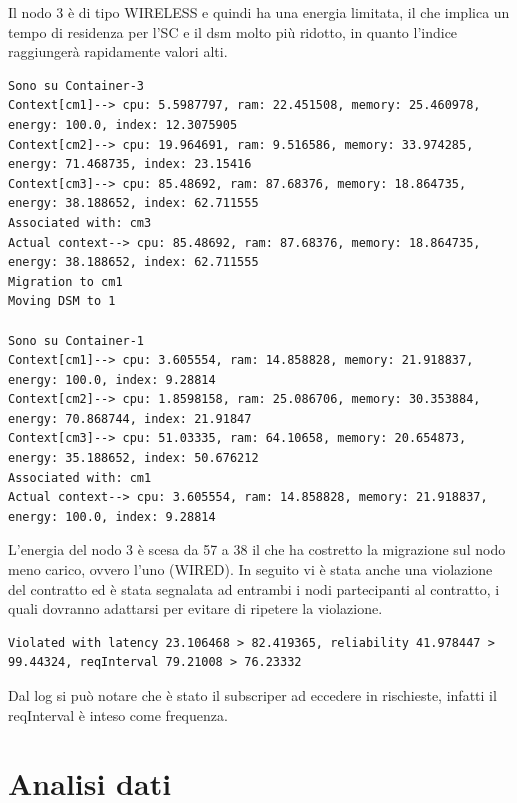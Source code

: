 Il nodo 3 è di tipo WIRELESS e quindi ha una energia limitata, il che implica un tempo di residenza per l'SC e il dsm molto più ridotto, in quanto l'indice raggiungerà rapidamente valori alti.
\begin{lstlisting}
Sono su Container-3
Context[cm1]--> cpu: 5.5987797, ram: 22.451508, memory: 25.460978, energy: 100.0, index: 12.3075905
Context[cm2]--> cpu: 19.964691, ram: 9.516586, memory: 33.974285, energy: 71.468735, index: 23.15416
Context[cm3]--> cpu: 85.48692, ram: 87.68376, memory: 18.864735, energy: 38.188652, index: 62.711555
Associated with: cm3
Actual context--> cpu: 85.48692, ram: 87.68376, memory: 18.864735, energy: 38.188652, index: 62.711555
Migration to cm1
Moving DSM to 1

Sono su Container-1
Context[cm1]--> cpu: 3.605554, ram: 14.858828, memory: 21.918837, energy: 100.0, index: 9.28814
Context[cm2]--> cpu: 1.8598158, ram: 25.086706, memory: 30.353884, energy: 70.868744, index: 21.91847
Context[cm3]--> cpu: 51.03335, ram: 64.10658, memory: 20.654873, energy: 35.188652, index: 50.676212
Associated with: cm1
Actual context--> cpu: 3.605554, ram: 14.858828, memory: 21.918837, energy: 100.0, index: 9.28814
\end{lstlisting}
L'energia del nodo 3 è scesa da 57 a 38 il che ha costretto la migrazione sul nodo meno carico, ovvero l'uno (WIRED). In seguito vi è stata anche una violazione del contratto ed è stata segnalata ad entrambi i nodi partecipanti al contratto, i quali dovranno adattarsi per evitare di ripetere la violazione.
\begin{lstlisting}
Violated with latency 23.106468 > 82.419365, reliability 41.978447 > 99.44324, reqInterval 79.21008 > 76.23332
\end{lstlisting}
Dal log si può notare che è stato il subscriper ad eccedere in rischieste, infatti il reqInterval è inteso come frequenza.
\section{Analisi dati}